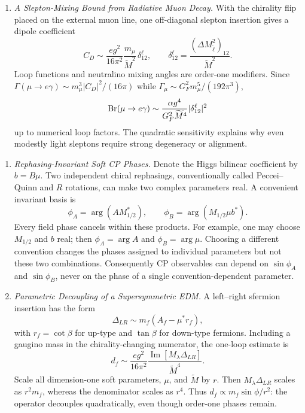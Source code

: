 \begin{enumerate}
\begin{enumerate}
\[        |(\delta^d_{12})_{LL}|
          \lesssim\frac{g^2}{g_s^2}\sin\theta_c\cos\theta_c
            \frac{m_c\widetilde M}{m_W^2},
      \]
      which is the scaling and approximate numerical bound in
      Eqs.~\eqref{eq:28.4.5}--\eqref{eq:28.4.6}.
    \item \emph{A Slepton-Mixing Bound from Radiative Muon Decay.}
    With the chirality flip placed on the external muon line, one
      off-diagonal slepton insertion gives a dipole coefficient
      \[
        C_D\sim
          \frac{eg^2}{16\pi^2}
          \frac{m_\mu}{\widetilde M^2}\,
          \delta^\ell_{12},
        \qquad
        \delta^\ell_{12}
          =\frac{(\Delta M_{\widetilde\ell}^2)_{12}}
                 {\widetilde M^2}.
      \]
      Loop functions and neutralino mixing angles are order-one modifiers.
      Since \(\Gamma(\mu\to e\gamma)\sim m_\mu^3|C_D|^2/(16\pi)\) while
      \(\Gamma_\mu\sim G_F^2m_\mu^5/(192\pi^3)\),
      \[
        {\rm Br}(\mu\to e\gamma)
          \sim\frac{\alpha g^4}{G_F^2\widetilde M^4}
            |\delta^\ell_{12}|^2
      \]
      up to numerical loop factors.  The quadratic sensitivity explains why
      even modestly light sleptons require strong degeneracy or alignment.
  \end{enumerate}

  \begin{enumerate}
    \item \emph{Rephasing-Invariant Soft CP Phases.}
    Denote the Higgs bilinear coefficient by \(b=B\mu\).  Two independent
      chiral rephasings, conventionally called Peccei--Quinn and \(R\)
      rotations, can make two complex parameters real.  A convenient
      invariant basis is
      \[
        \phi_A=\arg(AM_{1/2}^*),\qquad
        \phi_B=\arg(M_{1/2}\mu b^*).
      \]
      Every field phase cancels within these products.  For example, one may
      choose \(M_{1/2}\) and \(b\) real; then \(\phi_A=\arg A\) and
      \(\phi_B=\arg\mu\).  Choosing a different convention changes the
      phases assigned to individual parameters but not these two
      combinations.  Consequently CP observables can depend on
      \(\sin\phi_A\) and \(\sin\phi_B\), never on the phase of a single
      convention-dependent parameter.
    \item \emph{Parametric Decoupling of a Supersymmetric EDM.}
    A left--right sfermion insertion has the form
      \[
        \Delta_{LR}\sim m_f(A_f-\mu^*r_f),
      \]
      with \(r_f=\cot\beta\) for up-type and \(\tan\beta\) for down-type
      fermions.  Including a gaugino mass in the chirality-changing numerator,
      the one-loop estimate is
      \[
        d_f\sim
          \frac{eg^2}{16\pi^2}
          \frac{\operatorname{Im}
            [M_\lambda\Delta_{LR}]}{\widetilde M^4}.
      \]
      Scale all dimension-one soft parameters, \(\mu\), and
      \(\widetilde M\) by \(r\).  Then
      \(M_\lambda\Delta_{LR}\) scales as \(r^2m_f\), whereas the denominator
      scales as \(r^4\).  Thus
      \(d_f\propto m_f\sin\phi/r^2\): the operator decouples quadratically,
      even though order-one phases remain.
  \end{enumerate}


\end{enumerate}
